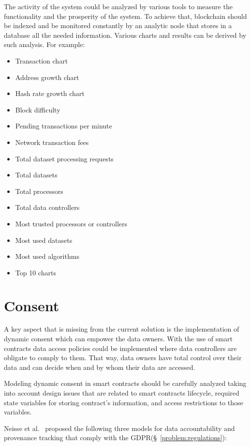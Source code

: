 The activity of the system could be analyzed by various tools to measure the functionality and the prosperity of the system. To achieve that, blockchain should be indexed and be monitored constantly by an analytic node that stores in a database all the needed information. Various charts and results can be derived by such analysis. For example:

\begin{itemize}
  \item Transaction chart
  \item Address growth chart
  \item Hash rate growth chart
  \item Block difficulty
  \item Pending transactions per minute
  \item Network transaction fees
  \item Total dataset processing requests
  \item Total datasets
  \item Total processors
  \item Total data controllers
  \item Most trusted processors or controllers
  \item Most used datasets
  \item Most used algorithms
  \item Top 10 charts
\end{itemize}

\section{Consent}
\label{future_work:consent}

A key aspect that is missing from the current solution is the implementation of dynamic consent which can empower the data owners. With the use of smart contracts data access policies could be implemented where data controllers are obligate to comply to them. That way, data owners have total control over their data and can decide when and by whom their data are accessed.

Modeling dynamic consent in smart contracts should be carefully analyzed taking into account design issues that are related to smart contracts lifecycle, required state variables for storing contract’s information, and access restrictions to those variables.

Neisse et al.~\cite{DBLP:journals/corr/NeisseSF17} proposed the following three models for data accountability and provenance tracking that comply with the GDPR(§~\ref{problem:regulations}):

